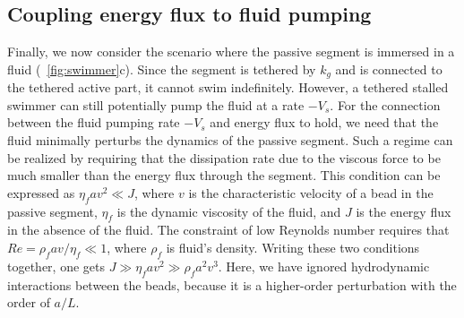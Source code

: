 \documentclass[
 preprint,
 preprintnumbers,
 amsmath,amssymb,
 aps,
 pre,
 longbibliography,
 superscriptaddress,
 10pt, twocolumn
]{revtex4-1}
\begin{document}

\subsection{Coupling energy flux to fluid pumping}
Finally, we now consider the scenario where the passive segment is immersed in a fluid (\figurename~\ref{fig:swimmer}c). Since the segment is tethered by $k_g$ and is connected to the tethered active part, it cannot swim indefinitely. However, a tethered stalled swimmer can still potentially pump the fluid \cite{Leoni2009BasicSwimmer,Golestanian2008AnalyticResults} at a rate $-V_s$. For the connection between the fluid pumping rate $-V_s$ and energy flux to hold, we need that the fluid minimally perturbs the dynamics of the passive segment. Such a regime can be realized by requiring that the dissipation rate due to the viscous force to be much smaller than the energy flux through the segment. This condition can be expressed as $\eta_f a v^2 \ll J$, where $v$ is the characteristic velocity of a bead in the passive segment, $\eta_f$ is the dynamic viscosity of the fluid, and $J$ is the energy flux in the absence of the fluid.
The constraint of low Reynolds number requires that $Re = \rho_f a v /\eta_f \ll 1$, where $\rho_f$ is fluid's density.
Writing these two conditions together, one gets $J \gg \eta_f a v^2 \gg \rho_f a^2 v^3$. 
Here, we have ignored hydrodynamic interactions between the beads, because it is a higher-order perturbation with the order of $a/L$. 
\end{document}
